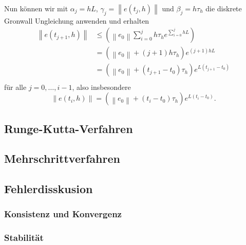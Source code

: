 Nun können wir mit $\alpha_j=hL$, $\gamma_j =\left\lVert e(t_j,h) \right\rVert$ und $\beta_j = h\tau_h$ die diskrete
Gronwall Ungleichung anwenden und erhalten
\begin{align*}
    \left\lVert e(t_{j+1},h) \right\rVert
    &\leq \left( \left\lVert e_0 \right\rVert \sum_{i=0}^{j} h\tau_h e^{\sum_{i=0}^{j} hL } \right)\\
    &= \left( \left\lVert e_0 \right\rVert + (j+1)h \tau_h \right)e^{(j+1)hL} \\
    &= \left( \left\lVert e_0 \right\rVert + (t_{j+1} - t_0) \tau_h \right)e^{L(t_{j+1} - t_0)} \\
\end{align*}
für alle $j=0, \dots, i-1$, also insbesondere
\[
    \left\lVert e(t_{i},h) \right\rVert
    = \left( \left\lVert e_0 \right\rVert + (t_{i} - t_0) \tau_h \right)e^{L(t_{i} - t_0)}.
\] \qedwhite

\subsection{Runge-Kutta-Verfahren}
\subsection{Mehrschrittverfahren}
\subsection{Fehlerdisskusion}
\subsubsection{Konsistenz und Konvergenz}
\subsubsection{Stabilität}